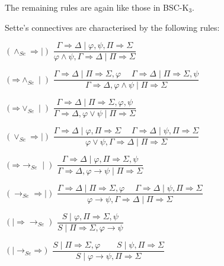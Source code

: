 \documentclass[10pt,a4paper]{article}
\theoremstyle{definition}
\newcommand{\3}{\vspace{.3in}}
\newcommand{\2}{\vspace{.2in}}
\newcommand{\1}{\vspace{.1in}}
\newcommand{\5}{\vspace{.05in}}
\begin{document}
The remaining rules are again like those in BSC-K$_3$. 

\1

Sette's connectives are characterised by the following rules:

\begin{flushleft}
		$(\mathord{\wedge_{\mathit{Se}}}\mathord{\Rightarrow\mid})$  $\dfrac{
			\Gamma \Rightarrow \Delta \mid \varphi, \psi, \Pi\Rightarrow\Sigma}{\varphi\wedge\psi, \Gamma
			\Rightarrow \Delta \mid \Pi\Rightarrow\Sigma}$
\end{flushleft}	\begin{flushleft}
$(\mathord{\Rightarrow}\mathord{\wedge_{\mathit{Se}}\mid})$  $\dfrac{\Gamma
			\Rightarrow \Delta \mid \Pi\Rightarrow\Sigma, \varphi \;\quad
			\Gamma\Rightarrow \Delta \mid \Pi\Rightarrow\Sigma, \psi}{\Gamma \Rightarrow \Delta,
			\varphi\wedge\psi \mid \Pi\Rightarrow\Sigma}$
\end{flushleft}
	
\begin{flushleft}
	 $(\mathord{\Rightarrow}\mathord{\vee_{\mathit{Se}}\mid})$ $\dfrac{\Gamma
			\Rightarrow \Delta \mid \Pi\Rightarrow\Sigma, \varphi,\psi } {\Gamma\Rightarrow \Delta,
			\varphi\vee\psi \mid \Pi\Rightarrow\Sigma}$
\end{flushleft}
		
\begin{flushleft}
			 $(\mathord{\vee_{\mathit{Se}}}\mathord{\Rightarrow\mid})$  $\dfrac{\Gamma
			\Rightarrow \Delta \mid \varphi, \Pi\Rightarrow\Sigma \;\quad \Gamma
			\Rightarrow \Delta \mid \psi, \Pi\Rightarrow\Sigma}{\varphi\vee\psi,
			\Gamma\Rightarrow \Delta \mid\Pi\Rightarrow\Sigma}$
\end{flushleft}
	
\begin{flushleft}
	 $(\mathord{\Rightarrow}\mathord{\rightarrow_{\mathit{Se}}\mid})$ $\dfrac{\Gamma
			\Rightarrow \Delta \mid \varphi, \Pi\Rightarrow\Sigma, \psi}{\Gamma\Rightarrow\Delta, \varphi\rightarrow\psi \mid \Pi\Rightarrow\Sigma}$
\end{flushleft} \begin{flushleft}
$(\mathord{\rightarrow_{\mathit{Se}}}\mathord{\Rightarrow\mid})$ $\dfrac{\Gamma
			\Rightarrow \Delta \mid \Pi\Rightarrow\Sigma, \varphi \;\quad \Gamma\Rightarrow\Delta \mid \psi,
			\Pi \Rightarrow \Sigma } {\varphi\rightarrow\psi, \Gamma
			\Rightarrow \Delta \mid \Pi\Rightarrow\Sigma}$
\end{flushleft}
	
\begin{flushleft}
	 $(\mathord{\mid\Rightarrow}\mathord{\rightarrow_{Se}})$ $\dfrac{S \mid \varphi, \Pi\Rightarrow\Sigma, \psi}{S \mid \Pi\Rightarrow\Sigma, \varphi\rightarrow\psi}$
\end{flushleft} \begin{flushleft}
$(\mathord{\mid\rightarrow_{Se}}\mathord{\Rightarrow})$ $\dfrac{S \mid \Pi\Rightarrow\Sigma, \varphi \qquad S \mid \psi,
		\Pi \Rightarrow \Sigma } {S \mid \varphi\rightarrow\psi, \Pi\Rightarrow\Sigma}$
\end{flushleft}
\end{document}
